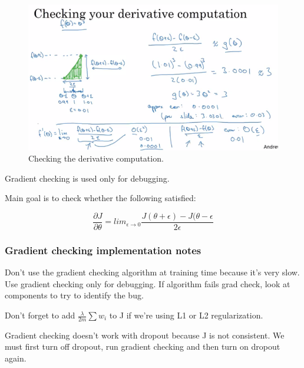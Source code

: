 \begin{figure}
    \centering
    \includegraphics[width=1.0\textwidth, trim={0 0 0 35}, clip]{img/c2/gradient-checking.png}
    \caption{Checking the derivative computation.}
    \label{gradient-checking}
\end{figure}

Gradient checking is used only for debugging.

Main goal is to check whether the following satisfied:

\begin{equation}
    \frac{\partial J}{\partial \theta} = lim_{\epsilon \to 0}\frac{J(\theta + \epsilon) - J(\theta - \epsilon}{2\epsilon}
\end{equation}




\subsubsection{Gradient checking implementation notes}
Don't use the gradient checking algorithm at training time because it's very slow. Use gradient checking only for debugging. If algorithm fails grad check, look at components to try to identify the bug.

Don't forget to add $\frac{\lambda}{2m} \sum w_i$ to J if we're using L1 or L2 regularization.

Gradient checking doesn't work with dropout because J is not consistent. We must first turn off dropout, run gradient checking and then turn on dropout again.

